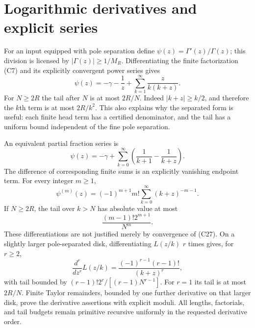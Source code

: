 \section{Logarithmic derivatives and explicit series}

For an input equipped with pole separation define
$\psi(z)=\Gamma'(z)/\Gamma(z)$; this division is licensed by
$|\Gamma(z)|\geq1/M_R$.  Differentiating the finite factorization (C7)
and its explicitly convergent power series gives
\[
 \boxed{\displaystyle
 \psi(z)=-\gamma-\frac1z+
       \sum_{k=1}^{\infty}\frac{z}{k(k+z)}.}
 \tag{C27}
\]
For $N\geq2R$ the tail after $N$ is at most $2R/N$.
Indeed $|k+z|\geq k/2$, and therefore the $k$th term is at most
$2R/k^2$.  This also explains why the separated form is useful: each
finite head term has a certified denominator, and the tail has a
uniform bound independent of the fine pole separation.

An equivalent partial fraction series is
\[
 \psi(z)=-\gamma+
 \sum_{k=0}^{\infty}\left(\frac1{k+1}-\frac1{k+z}\right).
 \tag{C28}
\]
The difference of corresponding finite sums is an explicitly vanishing
endpoint term.  For every integer $m\geq1$,
\[
 \boxed{\displaystyle
 \psi^{(m)}(z)=(-1)^{m+1}m!
               \sum_{k=0}^{\infty}(k+z)^{-m-1}.}
 \tag{C29}
\]
If $N\geq2R$, the tail over $k>N$ has absolute value at most
\[
 \frac{(m-1)!2^{m+1}}{N^m}.
 \tag{C30}
\]
These differentiations are not justified merely by convergence of
(C27).  On a slightly larger pole-separated disk, differentiating
$L(z/k)$ $r$ times gives, for $r\geq2$,
\[
 \frac{d^r}{dz^r}L(z/k)
   =\frac{(-1)^{r-1}(r-1)!}{(k+z)^r},
\]
with tail bounded by
$(r-1)!2^r/[(r-1)N^{r-1}]$.
For $r=1$ its tail is at most $2R/N$.
Finite Taylor remainders, bounded by one further derivative on that
larger disk, prove the derivative assertions with explicit moduli.
All lengths, factorials, and tail budgets remain primitive recursive
uniformly in the requested derivative order.

